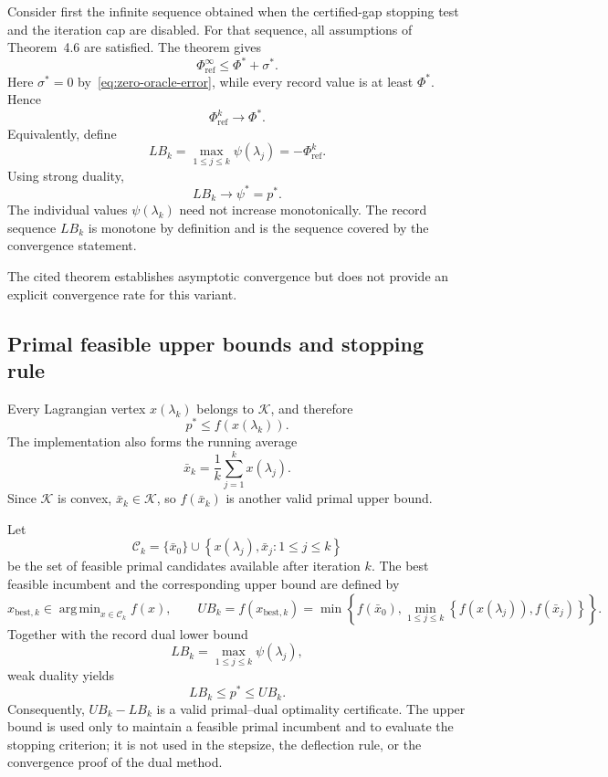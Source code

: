 \documentclass[12pt]{article}
\newcommand{\Kset}{\mathcal{K}}
\DeclareMathOperator*{\argmin}{arg\,min}
\begin{document}
Consider first the infinite sequence obtained when the certified-gap stopping
test and the iteration cap are disabled. For that sequence, all assumptions of
Theorem~4.6 are satisfied. The theorem gives
\[
\Phi_{\mathrm{ref}}^{\infty}\le\Phi^*+\sigma^*.
\]
Here $\sigma^*=0$ by~\eqref{eq:zero-oracle-error}, while every record value is at least $\Phi^*$.  Hence
\begin{equation}
\Phi_{\mathrm{ref}}^k\longrightarrow\Phi^*.
\label{eq:record-convergence}
\end{equation}
Equivalently, define
\begin{equation}
LB_k=\max_{1\le j\le k}\psi(\lambda_j)
=-\Phi_{\mathrm{ref}}^k.
\label{eq:dual-lb}
\end{equation}
Using strong duality,
\begin{equation}
LB_k\longrightarrow\psi^*=p^*.
\label{eq:lb-convergence}
\end{equation}
The individual values $\psi(\lambda_k)$ need not increase monotonically.  The record sequence $LB_k$ is monotone by definition and is the sequence covered by the convergence statement.

The cited theorem establishes asymptotic convergence but does not provide an explicit convergence rate for this variant.

\subsection{Primal feasible upper bounds and stopping rule}

Every Lagrangian vertex $x(\lambda_k)$ belongs to $\Kset$, and
therefore
\begin{equation}
p^*\le f(x(\lambda_k)).
\label{eq:vertex-ub}
\end{equation}
The implementation also forms the running average
\begin{equation}
\bar x_k
=
\frac1k\sum_{j=1}^{k}x(\lambda_j).
\label{eq:average-x}
\end{equation}
Since $\Kset$ is convex, $\bar x_k\in\Kset$, so
$f(\bar x_k)$ is another valid primal upper bound.

Let
\[
\mathcal C_k
=
\{\bar x_0\}
\cup
\left\{
x(\lambda_j),\bar x_j:
1\le j\le k
\right\}
\]
be the set of feasible primal candidates available after iteration
$k$. The best feasible incumbent and the corresponding upper bound are
defined by
\begin{equation}
x_{\mathrm{best},k}
\in
\argmin_{x\in\mathcal C_k}f(x),
\qquad
UB_k
=
f(x_{\mathrm{best},k})
=
\min\left\{
f(\bar x_0),
\min_{1\le j\le k}
\left\{
f(x(\lambda_j)),f(\bar x_j)
\right\}
\right\}.
\label{eq:dual-phase-ub}
\end{equation}
Together with the record dual lower bound
\[
LB_k
=
\max_{1\le j\le k}\psi(\lambda_j),
\]
weak duality yields
\begin{equation}
LB_k\le p^*\le UB_k.
\label{eq:certificate}
\end{equation}
Consequently, $UB_k-LB_k$ is a valid primal--dual optimality
certificate. The upper bound is used only to maintain a feasible
primal incumbent and to evaluate the stopping criterion; it is not
used in the stepsize, the deflection rule, or the convergence proof
of the dual method.
\end{document}
